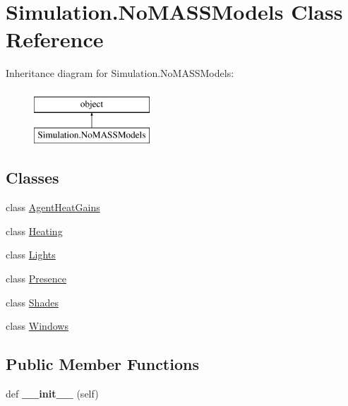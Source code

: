 \hypertarget{class_c_simulation_1_1_simulation_1_1_no_m_a_s_s_models}{}\section{Simulation.\+No\+M\+A\+S\+S\+Models Class Reference}
\label{class_c_simulation_1_1_simulation_1_1_no_m_a_s_s_models}
Inheritance diagram for Simulation.\+No\+M\+A\+S\+S\+Models\+:\begin{figure}[H]
\begin{center}
\leavevmode
\includegraphics[height=2.000000cm]{class_c_simulation_1_1_simulation_1_1_no_m_a_s_s_models}
\end{center}
\end{figure}
\subsection*{Classes}
\begin{DoxyCompactItemize}
\item 
class \hyperlink{class_c_simulation_1_1_simulation_1_1_no_m_a_s_s_models_1_1_agent_heat_gains}{Agent\+Heat\+Gains}
\item 
class \hyperlink{class_c_simulation_1_1_simulation_1_1_no_m_a_s_s_models_1_1_heating}{Heating}
\item 
class \hyperlink{class_c_simulation_1_1_simulation_1_1_no_m_a_s_s_models_1_1_lights}{Lights}
\item 
class \hyperlink{class_c_simulation_1_1_simulation_1_1_no_m_a_s_s_models_1_1_presence}{Presence}
\item 
class \hyperlink{class_c_simulation_1_1_simulation_1_1_no_m_a_s_s_models_1_1_shades}{Shades}
\item 
class \hyperlink{class_c_simulation_1_1_simulation_1_1_no_m_a_s_s_models_1_1_windows}{Windows}
\end{DoxyCompactItemize}
\subsection*{Public Member Functions}
\begin{DoxyCompactItemize}
\item 
\mbox{\label{class_c_simulation_1_1_simulation_1_1_no_m_a_s_s_models_ae64f0875afe3067b97ba370b354b9213}} 
def {\bfseries \+\_\+\+\_\+init\+\_\+\+\_\+} (self)
\end{DoxyCompactItemize}
